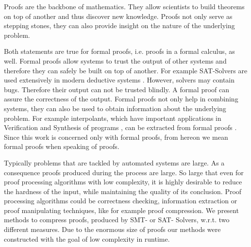 Proofs are the backbone of mathematics. 
They allow scientists to build theorems on top of another and thus discover new knowledge.
Proofs not only serve as stepping stones, they can also provide insight on the nature of the underlying problem.

Both statements are true for formal proofs, i.e. proofs in a formal calculus, as well.
Formal proofs allow systems to trust the output of other systems and therefore they can safely be built on top of another. 
For example SAT-Solvers are used extensively in modern deductive systems \cite{Biere2009}. 
However, solvers may contain bugs. 
Therefore their output can not be trusted blindly.
A formal proof can assure the correctness of the output.
Formal proofs not only help in combining systems, they can also be used to obtain information about the underlying problem.
For example interpolants, which have important applications in Verification and Synthesis of programs \cite{McMill2005}, can be extracted from formal proofs \cite{Hofferek2013}.
Since this work is concerned only with formal proofs, from hereon we mean formal proofs when speaking of proofs.

Typically problems that are tackled by automated systems are large. 
As a consequence proofs produced during the process are large.
So large that even for proof processing algorithms with low complexity, it is highly desirable to reduce the hardness of the input, while maintaining the quality of its conclusion.
Proof processing algorithms could be correctness checking, information extraction or proof manipulating techniques, like for example proof compression.
We present methods to compress proofs, produced by SMT- or SAT- Solvers, w.r.t. two different measures.
Due to the enormous size of proofs our methods were constructed with the goal of low complexity in runtime.

